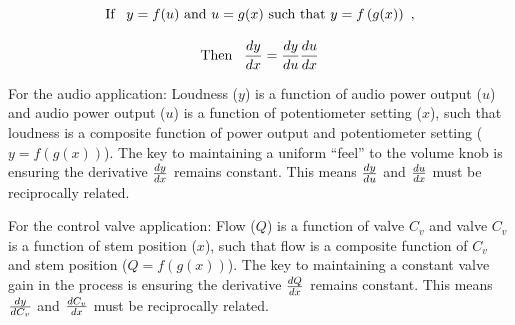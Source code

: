 $$\hbox{If \hskip 5pt} y = f(u) \hbox{ and } u = g(x) \hbox{ such that } y = f\left(g(x)\right) \hbox{ ,}$$

$$\hbox{Then \hskip 5pt} {dy \over dx} = {dy \over du}{du \over dx}$$

\filbreak 

For the audio application: Loudness ($y$) is a function of audio power output ($u$) and audio power output ($u$) is a function of potentiometer setting ($x$), such that loudness is a composite function of power output and potentiometer setting ($y = f(g(x))$).  The key to maintaining a uniform ``feel'' to the volume knob is ensuring the derivative $dy \over dx$ remains constant.  This means $dy \over du$ and $du \over dx$ must be reciprocally related.

\vskip 10pt

For the control valve application: Flow ($Q$) is a function of valve $C_v$ and valve $C_v$ is a function of stem position ($x$), such that flow is a composite function of $C_v$ and stem position ($Q = f(g(x))$).  The key to maintaining a constant valve gain in the process is ensuring the derivative $dQ \over dx$ remains constant.  This means $dy \over dC_v$ and $dC_v \over dx$ must be reciprocally related.





